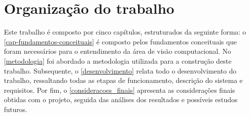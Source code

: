 \section{\textbf{Organização do trabalho}}

Este trabalho é composto por cinco capítulos, estruturados da seguinte forma: o \autoref{cap-fundamentos-conceituais} é composto pelos fundamentos conceituais que foram necessários para o entendimento da área de visão computacional. No \autoref{metodologia} foi abordado a metodologia utilizada para a construção deste trabalho.  Subsequente, o \autoref{desenvolvimento} relata todo o desenvolvimento do trabalho, ressaltando todas as etapas de funcionamento, descrição do sistema e requisitos. Por fim, o \autoref{consideracoes_finais} apresenta as considerações finais obtidas com o projeto, seguida das análises dos resultados e possíveis estudos futuros.